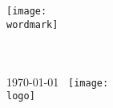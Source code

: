 \thispagestyle{empty}
\texttt{[image: \\wordmark]}

{%
  ~\sffamily
  \vfill
  {%
    \Huge\bfseries \papertitle
  }
  \bigskip
  {%
    \Large
    \firstname \surname \\[2ex]
    \papersubtitle
    \\[5ex]
    \today
  }
}
\vfill
~\hfill\texttt{[image: \\logo]}

\vspace*{-3cm}
\newpage
